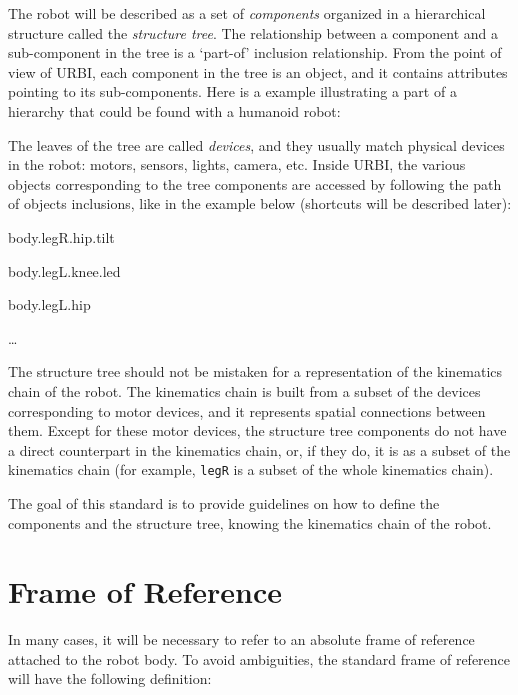 \documentclass[a4paper]{article}
\begin{document}
The robot will be described as a set of
\textit{components} organized in a hierarchical
structure called the \textit{structure tree}. The
relationship between a component and a sub-component in the tree is a
‘part-of’ inclusion relationship. From the point of view of URBI, each
component in the tree is an object, and it contains attributes pointing
to its sub-components. Here is a example illustrating a part of a
hierarchy that could be found with a humanoid robot:



\begin{figure}
\centering
\end{figure}

The leaves of the tree are called
\textit{devices}, and they usually match physical
devices in the robot: motors, sensors, lights, camera, etc. Inside
URBI, the various objects corresponding to the tree components are
accessed by following the path of objects inclusions, like in the
example below (shortcuts will be described later):

{
body.legR.hip.tilt}

{
body.legL.knee.led}

{
body.legL.hip}

{
…}


The structure tree should not be mistaken for a representation of the
kinematics chain of the robot. The kinematics chain is built from a
subset of the devices corresponding to motor devices, and it represents
spatial connections between them. Except for these motor devices, the
structure tree components do not have a direct counterpart in the
kinematics chain, or, if they do, it is as a subset of the kinematics
chain (for example, \texttt{legR} is a subset of the whole kinematics
chain).


The goal of this standard is to provide guidelines on how to define the
components and the structure tree, knowing the kinematics chain of the
robot.

\section{Frame of Reference}

In many cases, it will be necessary to refer to an absolute frame of
reference attached to the robot body. To avoid ambiguities, the
standard frame of reference will have the following definition:
\end{document}
